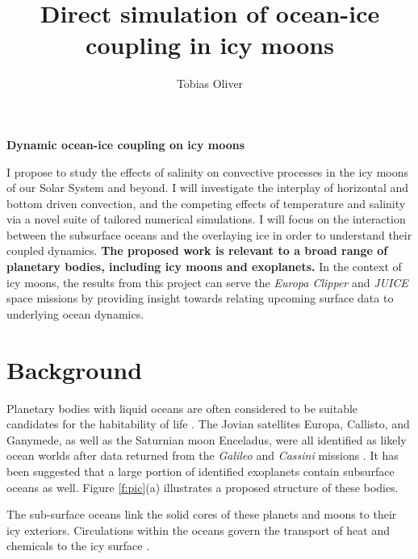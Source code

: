 \documentclass[12pt]{article}
\title{Direct simulation of ocean-ice coupling in icy moons}
\author{Tobias Oliver}
\date{}
\begin{document}
\newcommand{\citep}[1]{\cite{#1}}
\begin{center}
\large{\textbf{Dynamic ocean-ice coupling on icy moons}}
\end{center}

I propose to study the effects of salinity on convective processes in the icy moons of our Solar System and beyond. 
I will investigate the interplay of horizontal and bottom driven convection, and the competing effects of temperature and salinity via a novel suite of tailored numerical simulations. 
I will focus on the interaction between the subsurface oceans and the overlaying ice in order to understand their coupled dynamics. 
\textbf{The proposed work is relevant to a broad range of planetary bodies, including icy moons and exoplanets.} 
In the context of icy moons, the results from this project can serve the \textit{Europa Clipper} and \textit{JUICE} space missions by providing insight towards relating upcoming surface data to underlying ocean dynamics.

\section{Background}
Planetary bodies with liquid oceans are often considered to be suitable candidates for the habitability of life \citep{tB24}.
The Jovian satellites Europa, Callisto, and Ganymede, as well as the Saturnian moon Enceladus, were all identified as likely ocean worlds after data returned from the \textit{Galileo} and \textit{Cassini} missions \citep{fN16}. It has been suggested that a large portion of identified exoplanets contain subsurface oceans as well\citep{lQ20}.
Figure \ref{f:pic}(a) illustrates a proposed structure of these bodies. 

The sub-surface oceans link the solid cores of these planets and moons to their icy exteriors. Circulations within the oceans govern the transport of heat and chemicals to the icy surface \citep{kS20}. 
\end{document}
